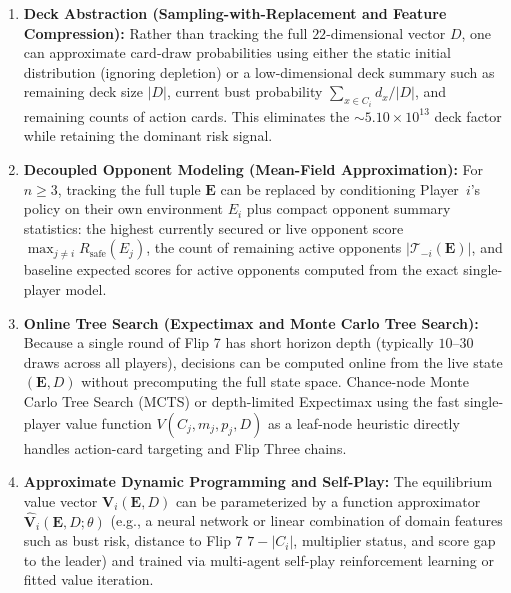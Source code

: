 \documentclass{article}
\theoremstyle{plain}
\theoremstyle{definition}
\theoremstyle{remark}
\begin{document}
\begin{enumerate}
    \item \textbf{Deck Abstraction (Sampling-with-Replacement and Feature Compression):} Rather than tracking the full $22$-dimensional vector $D$, one can approximate card-draw probabilities using either the static initial distribution (ignoring depletion) or a low-dimensional deck summary such as remaining deck size $|D|$, current bust probability $\sum_{x \in C_i} d_x / |D|$, and remaining counts of action cards. This eliminates the $\sim 5.10 \times 10^{13}$ deck factor while retaining the dominant risk signal.

    \item \textbf{Decoupled Opponent Modeling (Mean-Field Approximation):} For $n \ge 3$, tracking the full tuple $\mathbf{E}$ can be replaced by conditioning Player~$i$'s policy on their own environment $E_i$ plus compact opponent summary statistics: the highest currently secured or live opponent score $\max_{j \neq i} R_{\text{safe}}(E_j)$, the count of remaining active opponents $|\mathcal{T}_{-i}(\mathbf{E})|$, and baseline expected scores for active opponents computed from the exact single-player model.

    \item \textbf{Online Tree Search (Expectimax and Monte Carlo Tree Search):} Because a single round of Flip 7 has short horizon depth (typically $10$--$30$ draws across all players), decisions can be computed online from the live state $(\mathbf{E}, D)$ without precomputing the full state space. Chance-node Monte Carlo Tree Search (MCTS) or depth-limited Expectimax using the fast single-player value function $V(C_j, m_j, p_j, D)$ as a leaf-node heuristic directly handles action-card targeting and Flip Three chains.

    \item \textbf{Approximate Dynamic Programming and Self-Play:} The equilibrium value vector $\mathbf{V}_i(\mathbf{E}, D)$ can be parameterized by a function approximator $\widehat{\mathbf{V}}_i(\mathbf{E}, D; \theta)$ (e.g., a neural network or linear combination of domain features such as bust risk, distance to Flip 7 $7 - |C_i|$, multiplier status, and score gap to the leader) and trained via multi-agent self-play reinforcement learning or fitted value iteration.
\end{enumerate}

\printbibliography
\end{document}
